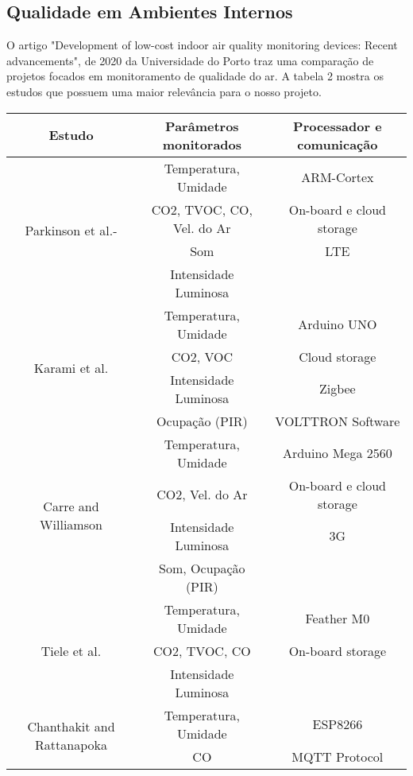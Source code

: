\documentclass[../monografia.tex]{subfiles}
\begin{document}
\subsection{Qualidade em Ambientes Internos}

O artigo "Development of low-cost indoor air quality monitoring devices:
Recent advancements", de 2020 da Universidade do Porto \cite{IAQ_Compare} traz uma comparação de projetos focados em monitoramento de qualidade do ar. A tabela 2 mostra os estudos que possuem uma maior relevância para o nosso projeto. 

\begin{center}
\begin{longtable}{ |c|c|c| } 
\hline %
\textbf{Estudo} & \textbf{Parâmetros monitorados} & \textbf{Processador e comunicação} \\ 
\hline %
\multirow{4}{8em}{Parkinson et al.\cite{PARKINSON201915}-\cite{PARKINSON2019241}} & Temperatura, Umidade & ARM-Cortex \\
& CO2, TVOC, CO, Vel. do Ar & On-board e cloud storage \\ 
& Som & LTE \\ 
& Intensidade Luminosa  &  \\ 
\hline %
\multirow{4}{8em}{Karami et al.\cite{KARAMI2018412}} & Temperatura, Umidade & Arduino UNO \\ 
& CO2, VOC & Cloud storage \\ 
& Intensidade Luminosa & Zigbee \\ 
& Ocupação (PIR)  & VOLTTRON Software \\ 
\hline %
\multirow{4}{8em}{Carre and Williamson\cite{CARRE20181751}} & Temperatura, Umidade & Arduino Mega 2560 \\ 
& CO2, Vel. do Ar & On-board e cloud storage \\ 
& Intensidade Luminosa & 3G \\ 
& Som, Ocupação (PIR)  &  \\ 
\hline %
\multirow{3}{8em}{Tiele et al.\cite{Tiele2018}} & Temperatura, Umidade & Feather M0 \\ 
& CO2, TVOC, CO & On-board storage \\ 
& Intensidade Luminosa &  \\ 
\hline %
\multirow{3}{8em}{Chanthakit and Rattanapoka\cite{Chanthakit2018}} & Temperatura, Umidade & ESP8266 \\  %
& CO & MQTT Protocol \\ 

\end{longtable}
\end{center}
\end{document}
